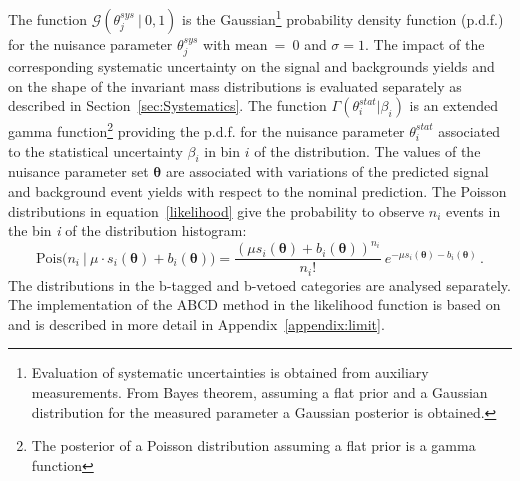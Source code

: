 The function $\mathcal{G}(\theta_j^{sys} ~ | ~ 0, 1)$
is the  Gaussian\footnote{Evaluation of systematic uncertainties is obtained from auxiliary measurements. From Bayes theorem,
	assuming a flat prior and a Gaussian distribution for the measured parameter a Gaussian posterior is obtained.	
}
probability density function (p.d.f.) for the nuisance parameter $\theta_j^{sys}$ with mean~=~0 and $\sigma = 1$.  
The impact of the corresponding systematic uncertainty
on the  signal and backgrounds yields and on the shape of the \mmc invariant mass distributions
 is evaluated separately as described in Section~\ref{sec:Systematics}.
The function  $\Gamma(\theta^{stat}_i | \beta_i)$ is an extended gamma function\footnote{The posterior of a
	Poisson distribution assuming a flat prior is a gamma function}
providing the p.d.f. for the nuisance parameter $\theta^{stat}_i$ associated
to the statistical uncertainty $ \beta_i$ in  bin $i$ of the \mmc distribution.
The values of the nuisance parameter set $\boldsymbol{\theta}$ are associated with  variations of the predicted
signal and background event yields with respect to the nominal prediction.
The Poisson distributions in equation~\eqref{likelihood} give the probability to observe $n_i$ events in the bin \textit{i} of the \mmc 
distribution histogram:
$$
 \text{Pois(}n_i ~ | ~ \mu \cdot s_i(\boldsymbol{\theta}) + b_i(\boldsymbol{\theta})) =  \frac{(\mu s_i(\boldsymbol{\theta}) 
	+b_i(\boldsymbol{\theta}))^{n_i}}{n_i!} ~ e^{-\mu s_i(\boldsymbol{\theta})  -b_i(\boldsymbol{\theta})} \,.
$$
The \mmc distributions in the b-tagged and b-vetoed categories are analysed separately.
The  implementation of the ABCD method in the likelihood function is based on~\cite{ABCD}
and is described in more detail in Appendix~\ref{appendix:limit}.

